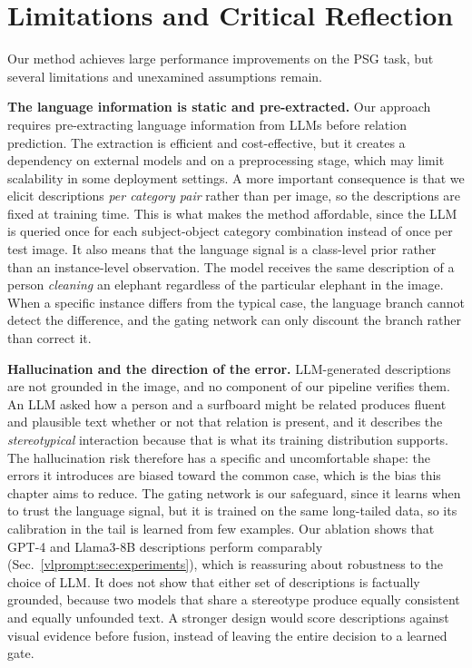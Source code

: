 
\section{Limitations and Critical Reflection}
\label{sec:limitation}
Our method achieves large performance improvements on the PSG task, but several limitations and unexamined assumptions remain.

\noindent \textbf{The language information is static and pre-extracted.}
Our approach requires pre-extracting language information from LLMs before relation prediction. The extraction is efficient and cost-effective, but it creates a dependency on external models and on a preprocessing stage, which may limit scalability in some deployment settings. A more important consequence is that we elicit descriptions \emph{per category pair} rather than per image, so the descriptions are fixed at training time. This is what makes the method affordable, since the LLM is queried once for each subject-object category combination instead of once per test image. It also means that the language signal is a class-level prior rather than an instance-level observation. The model receives the same description of a person \textit{cleaning} an elephant regardless of the particular elephant in the image. When a specific instance differs from the typical case, the language branch cannot detect the difference, and the gating network can only discount the branch rather than correct it.

\noindent \textbf{Hallucination and the direction of the error.}
LLM-generated descriptions are not grounded in the image, and no component of our pipeline verifies them. An LLM asked how a person and a surfboard might be related produces fluent and plausible text whether or not that relation is present, and it describes the \emph{stereotypical} interaction because that is what its training distribution supports. The hallucination risk therefore has a specific and uncomfortable shape: the errors it introduces are biased toward the common case, which is the bias this chapter aims to reduce. The gating network is our safeguard, since it learns when to trust the language signal, but it is trained on the same long-tailed data, so its calibration in the tail is learned from few examples. Our ablation shows that GPT-4 and Llama3-8B descriptions perform comparably (Sec.~\ref{vlprompt:sec:experiments}), which is reassuring about robustness to the choice of LLM. It does not show that either set of descriptions is factually grounded, because two models that share a stereotype produce equally consistent and equally unfounded text. A stronger design would score descriptions against visual evidence before fusion, instead of leaving the entire decision to a learned gate.

